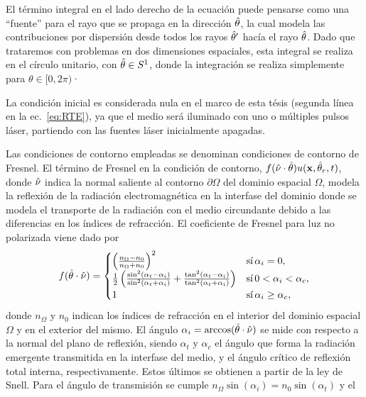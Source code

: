 El término integral en el lado derecho de la ecuación 
puede pensarse como una ``fuente'' para el rayo que se propaga en la dirección $\hat{\theta}$, 
la cual modela las contribuciones por dispersión desde todos los rayos $\hat{\theta}'$ 
hacía el rayo $\hat{\theta}$. Dado que trataremos con problemas en dos dimensiones espaciales, 
esta integral se realiza en el círculo unitario, con $\hat{\theta} \in S^1$, 
donde la integración se realiza simplemente para $\theta \in [0,2\pi)$·

La condición inicial es considerada nula en el marco de esta tésis 
(segunda línea en la ec.~\eqref{eq:RTE}), ya 
que el medio será iluminado con uno o múltiples pulsos láser, partiendo con las 
fuentes láser inicialmente apagadas. 

Las condiciones de contorno empleadas se denominan condiciones de contorno de Fresnel. 
El término de Fresnel en la condición de contorno, $f(\hat{\nu} \cdot \hat{\theta}) u(\mathbf{x},\hat{\theta}_r,t)$, 
donde $\hat{\nu}$ indica la normal saliente al contorno $\partial \Omega$ del dominio espacial 
$\Omega$, 
modela la reflexión de la radiación electromagnética 
en la interfase del dominio donde se modela el transporte de la radiación 
con el medio circundante debido a las diferencias 
en los índices de refracción. El coeficiente de Fresnel para luz no polarizada viene dado por~\cite{Born1999}
\begin{equation}
f(\hat{\theta} \cdot \hat{\nu}) =
     \begin{cases}
      \left( \frac{n_{\Omega}-n_0}{n_{\Omega}+n_0} \right)^2  & \text{sí} \, \alpha_i = 0, \\
       \frac{1}{2}\left(\frac{\sin^2(\alpha_t-\alpha_i)}{\sin^2(\alpha_t+
       \alpha_i)}+\frac{\tan^2(\alpha_t-\alpha_i)}{\tan^2(\alpha_t+\alpha_i)}\right) & 
       \text{sí} \, 0<\alpha_i < \alpha_c, \\
      1  & \text{sí} \, \alpha_i \ge \alpha_c, \\
     \end{cases}
\end{equation}
donde $n_\Omega$ y $n_0$ indican los índices de refracción en el interior 
del dominio espacial $\Omega$ y en el exterior del mismo. El ángulo $\alpha_i=\arccos(\hat{\theta} \cdot \hat{\nu})$ 
se mide con respecto a la normal del plano de reflexión, siendo $\alpha_t$ y $\alpha_c$ 
el ángulo que forma la radiación emergente transmitida en la interfase del medio, y el ángulo 
crítico de reflexión total interna, respectivamente. Estos últimos se obtienen a partir de la ley de Snell. 
Para el ángulo de transmisión se cumple $n_{\Omega} \sin(\alpha_i)=n_0 \sin (\alpha_t)$ y el 
